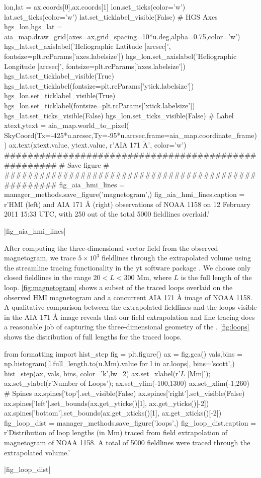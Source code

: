 \begin{pycode}
lon,lat = ax.coords[0],ax.coords[1]
lon.set_ticks(color='w')
lat.set_ticks(color='w')
lat.set_ticklabel_visible(False)
# HGS Axes
hgs_lon,hgs_lat = aia_map.draw_grid(axes=ax,grid_spacing=10*u.deg,alpha=0.75,color='w')
hgs_lat.set_axislabel('Heliographic Latitude [arcsec]',
                      fontsize=plt.rcParams['axes.labelsize'])
hgs_lon.set_axislabel('Heliographic Longitude [arcsec]',
                      fontsize=plt.rcParams['axes.labelsize'])
hgs_lat.set_ticklabel_visible(True)
hgs_lat.set_ticklabel(fontsize=plt.rcParams['ytick.labelsize'])
hgs_lon.set_ticklabel_visible(True)
hgs_lon.set_ticklabel(fontsize=plt.rcParams['xtick.labelsize'])
hgs_lat.set_ticks_visible(False)
hgs_lon.set_ticks_visible(False)
# Label
xtext,ytext = aia_map.world_to_pixel(
    SkyCoord(Tx=-425*u.arcsec,Ty=-95*u.arcsec,frame=aia_map.coordinate_frame))
ax.text(xtext.value, ytext.value, r'AIA 171 $\mathrm{\mathring{A}}$', color='w')
####################################################
#                  Save figure                     #
####################################################
fig_aia_hmi_lines = manager_methods.save_figure('magnetogram',)
fig_aia_hmi_lines.caption = r'HMI (left) and AIA 171 \AA{} (right) observations of \AR{} NOAA 1158 on 12 February 2011 15:33 UTC, with 250 out of the total 5000 fieldlines overlaid.'
\end{pycode}
|fig_aia_hmi_lines|

After computing the three-dimensional vector field from the observed magnetogram, we trace $5\times10^3$ fieldlines through the extrapolated volume using the streamline tracing functionality in the yt software package \citep{turk_yt_2011}. We choose only closed fieldlines in the range $20<L<300$ Mm, where $L$ is the full length of the loop. \autoref{fig:magnetogram} shows a subset of the traced loops overlaid on the observed HMI magnetogram and a concurrent AIA 171 \AA{} image of NOAA 1158. A qualitative comparison between the extrapolated fieldlines and the loops visible in the AIA 171 \AA{} image reveals that our field extrapolation and line tracing does a reasonable job of capturing the three-dimensional geometry of the \AR{}. \autoref{fig:loops} shows the distribution of full lengths for the traced loops.

\begin{pycode}
from formatting import hist_step
fig = plt.figure()
ax = fig.gca()
vals,bins = np.histogram([l.full_length.to(u.Mm).value for l in ar.loops], bins='scott',)
hist_step(ax, vals, bins, color='k',lw=2)
ax.set_xlabel(r'$L$ [Mm]');
ax.set_ylabel(r'Number of Loops');
ax.set_ylim(-100,1300)
ax.set_xlim(-1,260)
# Spines
ax.spines['top'].set_visible(False)
ax.spines['right'].set_visible(False)
ax.spines['left'].set_bounds(ax.get_yticks()[1], ax.get_yticks()[-2])
ax.spines['bottom'].set_bounds(ax.get_xticks()[1], ax.get_xticks()[-2])
fig_loop_dist = manager_methods.save_figure('loops',)
fig_loop_dist.caption = r'Distribution of loop lengths (in Mm) traced from field extrapolation of magnetogram of NOAA 1158. A total of 5000 fieldlines were traced through the extrapolated volume.'
\end{pycode}
|fig_loop_dist|

